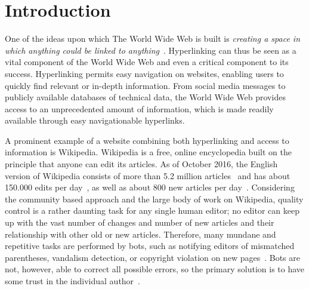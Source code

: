 \chapter{Introduction}\label{ch:introduction}
One of the ideas upon which The World Wide Web is built is \emph{creating a space in which anything could be linked to anything}~\cite[ch.~1, p.~4]{Weaving-the-web}. Hyperlinking can thus be seen as a vital component of the World Wide Web and even a critical component to its success. Hyperlinking permits easy navigation on websites, enabling users to quickly find relevant or in-depth information. From social media messages to publicly available databases of technical data, the World Wide Web provides access to an unprecedented amount of information, which is made readily available through easy navigationable hyperlinks.

A prominent example of a website combining both hyperlinking and access to information is Wikipedia. Wikipedia is a free, online encyclopedia built on the principle that anyone can edit its articles. As of October 2016, the English version of Wikipedia consists of more than 5.2 million articles~\cite{wiki-about} and has about 150.000 edits per day~\cite{wiki-num-edits}, as well as about 800 new articles per day~\cite{wmcharts}. Considering the community based approach and the large body of work on Wikipedia, quality control is a rather daunting task for any single human editor; no editor can keep up with the vast number of changes and number of new articles and their relationship with other old or new articles. Therefore, many mundane and repetitive tasks are performed by bots, such as notifying editors of mismatched parentheses, vandalism detection, or copyright violation on new pages~\cite{wiki-bots}. Bots are not, however, able to correct all possible errors, so the primary solution is to have some trust in the individual author~\cite{wiki-editor-guidelines}.

